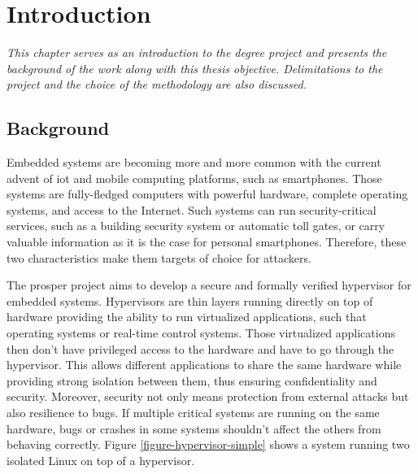 \documentclass{kththesis}
\begin{document}

\begingroup
\hypersetup{linkcolor=black}
\tableofcontents
\endgroup

\printglossaries

\mainmatter %

\chapter{Introduction}
\vspace{-1cm}
\textit{This chapter serves as an introduction to the degree project and presents the background of the work along with this thesis objective. Delimitations to the project and the choice of the methodology are also discussed.}

\section{Background}

Embedded systems are becoming more and more common with the current advent of \Gls{iot} and mobile computing platforms, such as smartphones. Those systems are fully-fledged computers with powerful hardware, complete operating systems, and access to the Internet. Such systems can run security-critical services, such as a building security system or automatic toll gates, or carry valuable information as it is the case for personal smartphones. Therefore, these two characteristics make them targets of choice for attackers.

The \gls{prosper} project \cite{noauthor_prosper:_nodate} aims to develop a secure and formally verified hypervisor for embedded systems. Hypervisors are thin layers running directly on top of hardware providing the ability to run virtualized applications, such that operating systems or real-time control systems. Those virtualized applications then don't have privileged access to the hardware and have to go through the hypervisor. This allows different applications to share the same hardware while providing strong isolation between them, thus ensuring confidentiality and security. Moreover, security not only means protection from external attacks but also resilience to bugs. If multiple critical systems are running on the same hardware, bugs or crashes in some systems shouldn't affect the others from behaving correctly. Figure \ref{figure-hypervisor-simple} shows a system running two isolated Linux on top of a hypervisor.
\end{document}
